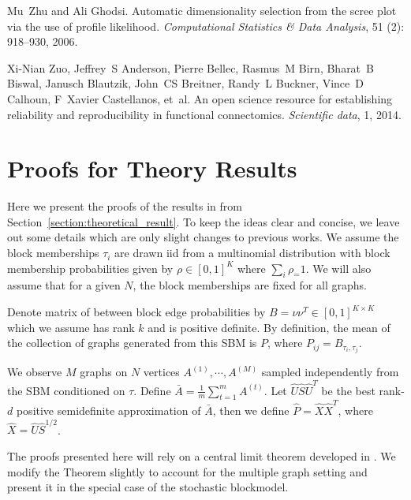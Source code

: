 \documentclass[10pt,letterpaper]{article}
\begin{document}
\begin{thebibliography}{10}
Mu~Zhu and Ali Ghodsi.
\newblock Automatic dimensionality selection from the scree plot via the use of
  profile likelihood.
\newblock \emph{Computational Statistics \& Data Analysis}, 51
  (2): 918--930, 2006.

Xi-Nian Zuo, Jeffrey~S Anderson, Pierre Bellec, Rasmus~M Birn, Bharat~B Biswal,
  Janusch Blautzik, John~CS Breitner, Randy~L Buckner, Vince~D Calhoun,
  F~Xavier Castellanos, et~al.
\newblock An open science resource for establishing reliability and
  reproducibility in functional connectomics.
\newblock \emph{Scientific data}, 1, 2014.

\end{thebibliography}

\appendix

\section{Proofs for Theory Results}
Here we present the proofs of the results in from Section~\ref{section:theoretical_result}. To keep the ideas clear and concise, we leave out some details which are only slight changes to previous works.
We assume the block memberships $\tau_i$ are drawn iid from a multinomial distribution with block membership probabilities given by $\rho\in[0,1]^K$ where $\sum_i \rho_=1$.
We will also assume that for a given $N$, the block memberships are fixed for all graphs.

Denote matrix of between block edge probabilities by $B = \nu \nu^T\in[0,1]^{K\times K}$ which we assume has rank $k$ and is positive definite. 
By definition, the mean of the collection of graphs generated from this SBM is $P$, where $P_{ij} = B_{\tau_i, \tau_j}$. 

We observe $M$ graphs on $N$ vertices $A^{(1)}, \cdots, A^{(M)}$ sampled independently from the SBM conditioned on $\tau$.
Define $\bar{A} = \frac{1}{m} \sum_{t=1}^m A^{(t)}$. Let $\hat{U} \hat{S} \hat{U}^T$ be the best rank-$d$ positive semidefinite approximation of $\bar{A}$, then we define $\hat{P} = \hat{X} \hat{X}^T$, where $\hat{X} = \hat{U} \hat{S}^{1/2}$.




The proofs presented here will rely on a central limit theorem developed in \citet{athreya2013limit}. 
We modify the Theorem slightly to account for the multiple graph setting and present it in the special case of the stochastic blockmodel.
\end{document}
